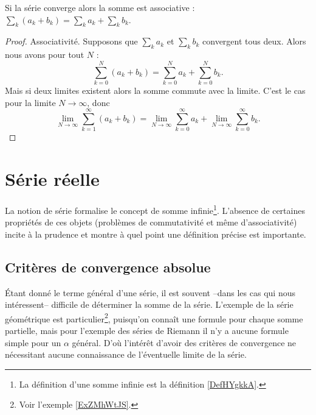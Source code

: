\begin{proposition}     \label{PROPooUEBWooUQBQvP}
    Si la série converge alors la somme est associative :
    \( \sum_k (a_k+b_k) = \sum_k a_k + \sum_k b_k \).
\end{proposition}

\begin{proof}
    Associativité. Supposons que \( \sum_ka_k\) et \( \sum_kb_k\) convergent tous deux. Alors nous avons pour tout \( N\) :
    \begin{equation}
        \sum_{k=0}^N(a_k+b_k)=\sum_{k=0}^Na_k+\sum_{k=0}^Nb_k.
    \end{equation}
    Mais si deux limites existent alors la somme commute avec la limite. C'est le cas pour la limite \( N\to \infty\), donc
    \begin{equation}
        \lim_{N\to \infty} \sum_{k=1}^{\infty}(a_k+b_k)=\lim_{N\to \infty} \sum_{k=0}^{\infty}a_k+\lim_{N\to \infty} \sum_{k=0}^{\infty}b_k.
    \end{equation}
\end{proof}

\section{Série réelle}
\label{secseries}

La notion de série formalise le concept de somme infinie\footnote{La définition d'une somme infinie est la définition \ref{DefHYgkkA}.}. L'absence de certaines propriétés de ces objets (problèmes de commutativité et même d'associativité) incite à la prudence et montre à quel point une définition précise est importante.


\subsection{Critères de convergence absolue}

Étant donné le terme général d'une série, il est souvent --dans les cas qui nous intéressent-- difficile de déterminer la somme de la série. L'exemple de la série géométrique est particulier\footnote{Voir l'exemple \ref{ExZMhWtJS}.}, puisqu'on connaît une formule pour chaque somme partielle, mais pour l'exemple des séries de Riemann il n'y a aucune formule simple pour un $\alpha$ général. D'où l'intérêt d'avoir des critères de convergence ne nécessitant aucune connaissance de l'éventuelle limite de la série.


